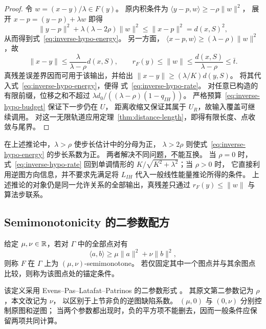 \begin{proof}
令 $w=(x-y)/\lambda\in F(y)$。
原内积条件为 $\langle y-p,w\rangle\ge-\rho\|w\|^2$，
展开 $x-p=(y-p)+\lambda w$ 即得
\[
 \|y-p\|^2+\lambda(\lambda-2\rho)\|w\|^2
 \le\|x-p\|^2=d(x,S)^2,
\]
从而得到式~\eqref{eq:inverse-hypo-energy}。
另一方面，
$\langle x-p,w\rangle\ge(\lambda-\rho)\|w\|^2$，故
\[
 \|x-y\|\le\frac{\lambda}{\lambda-\rho}d(x,S),
 \qquad r_F(y)\le\|w\|
 \le\frac{d(x,S)}{\lambda-\rho}\le\bar t.
\]
真残差误差界因而可用于该输出，并给出
$\|x-y\|\ge(\lambda/K)d(y,S)$。
将其代入式~\eqref{eq:inverse-hypo-energy}，便得
式~\eqref{eq:inverse-hypo-rate}。
对任意已构造的有限前缀，位移之和不超过
$\lambda d_0/((\lambda-\rho)(1-q_{IH}))$。
严格预算~\eqref{eq:inverse-hypo-budget} 保证下一步仍在 $U$，
距离收缩又保证其属于 $U_R$，故输入覆盖可继续调用。
对这一无限轨道应用定理~\ref{thm:distance-length}，即得有限长度、点收敛与尾界。
\end{proof}

\begin{remark}[逆图耗散所需的参数余量]
在上述推论中，$\lambda>\rho$ 使步长估计中的分母为正，
$\lambda>2\rho$ 则使式~\eqref{eq:inverse-hypo-energy} 的步长系数为正。
两者解决不同问题，不能互换。
当 $\rho=0$ 时，式~\eqref{eq:inverse-hypo-rate} 回到单调情形的
$K/\sqrt{K^2+\lambda^2}$；当 $\rho>0$ 时，
它直接利用逆图方向信息，并不要求先满足将 $L_{IH}$ 代入一般线性能量推论所得的条件。
上述推论的对象仍是同一允许关系的全部输出，真残差只通过
$r_F(y)\le\|w\|$ 与算法步联系。
\end{remark}

\subsection{Semimonotonicity 的二参数配方}
\label{subsec:semimonotonicity}

\begin{definition}[二参数半单调性]
\label{def:semimonotonicity}
给定 $\mu,\nu\in\mathbb R$，若对 $\Gamma$ 中的全部点对有
\begin{equation}
 \langle a,b\rangle\ge\mu\|a\|^2+\nu\|b\|^2,
 \label{eq:semimonotonicity}
\end{equation}
则称 $F$ 在 $\Gamma$ 上为 $(\mu,\nu)$-semimonotone。
若仅固定其中一个图点并与其余图点比较，则称为该图点处的锚定条件。
\end{definition}

该定义采用 Evens--Pas--Latafat--Patrinos 的二参数形式
\cite[Definition~4.1]{EvensEtAl2024SemimonotoneV2}。
其原文第二参数记为 $\rho$，本文改记为 $\nu$，
以区别于上节非负的逆图缺陷系数。
$(\mu,0)$ 与 $(0,\nu)$ 分别控制原图和逆图；
当两个参数都出现时，负的平方项不能删去，因而一般条件应保留两项共同计算。

